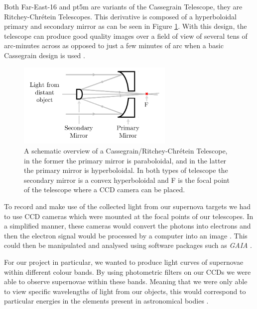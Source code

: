 \documentclass[twocolumn]{revtex4}
\newcommand{\squeezeup}{\vspace{-2.5mm}}
\begin{document}
Both Far-East-16 and pt5m are variants of the Cassegrain Telescope, they are Ritchey-Chr\'{e}tein Telescopes. This derivative is composed of a hyperboloidal primary and secondary mirror \cite{tel_tech} as can be seen in Figure \ref{cassegrain}. With this design, the telescope can produce good quality images over a field of view of several tens of arc-minutes across as opposed to just a few minutes of arc when a basic Cassegrain design is used \cite{tel_tech}. 
\squeezeup
\begin{figure}[!h]
\begin{center}
\includegraphics[width=7.5cm]{observations/cassegrain}
\caption[]{A schematic overview of a Cassegrain/Ritchey-Chr\'{e}tein Telescope, in the former the primary mirror is paraboloidal, and in the latter the primary mirror is hyperboloidal. In both types of telescope the secondary mirror is a convex hyperboloidal and F is the focal point of the telescope where a CCD camera can be placed.}
\label{cassegrain}
\end{center}
\end{figure}
\squeezeup
\squeezeup

To record and make use of the collected light from our supernova targets we had to use CCD cameras which were mounted at the focal points of our telescopes. In a simplified manner, these cameras would convert the photons into electrons and then the electron signal would be processed by a computer into an image \cite{mod_ast, tel_tech}. This could then be manipulated and analysed using software packages such as \textit{GAIA} \cite{starlink}.

For our project in particular, we wanted to produce light curves of supernovae within different colour bands. By using photometric filters on our CCDs we were able to observe supernovae within these bands. Meaning that we were only able to view specific wavelengths of light from our objects, this would correspond to particular energies in the elements present in astronomical bodies \cite{astro_filters}. 

\end{document}
